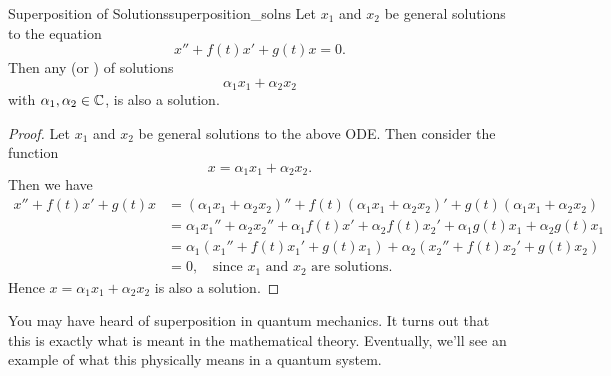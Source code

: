         \begin{thm}{Superposition of Solutions}{superposition_solns}
        Let $x_1$ and $x_2$ be general solutions to the equation
        \[
        x''+f(t)x'+g(t)x=0.
        \]
        Then any  (or ) of solutions
        \[
        \alpha_1 x_1 + \alpha_2 x_2
        \]
        with $\alpha_1,\alpha_2\in \mathbb{C}$, is also a solution.\\

        \begin{proof}
        Let $x_1$ and $x_2$ be general solutions to the above ODE. Then consider the function
        \[
        x=\alpha_1 x_1 + \alpha_2 x_2.
        \]
        Then we have
        \begin{align*}
            x''+f(t)x'+g(t)x&= (\alpha_1 x_1 + \alpha_2 x_2)''+f(t)(\alpha_1x_1+\alpha_2 x_2)'+g(t)(\alpha_1x_1+\alpha_2x_2)\\
            &= \alpha_1 x_1'' + \alpha_2 x_2'' + \alpha_1 f(t)x'+\alpha_2 f(t)x_2'+\alpha_1 g(t)x_1 + \alpha_2 g(t) x_1\\
            &= \alpha_1 ( x_1''+f(t)x_1'+g(t)x_1)+\alpha_2(x_2''+f(t)x_2'+g(t)x_2)\\
            &=0, \quad\textrm{since $x_1$ and $x_2$ are solutions.}
        \end{align*}
        Hence $x=\alpha_1x_1 + \alpha_2 x_2$ is also a solution.
        \end{proof}
        \end{thm}

        \begin{remark}
        You may have heard of superposition in quantum mechanics. It turns out that this is exactly what is meant in the mathematical theory. Eventually, we'll see an example of what this physically means in a quantum system.
        \end{remark}

